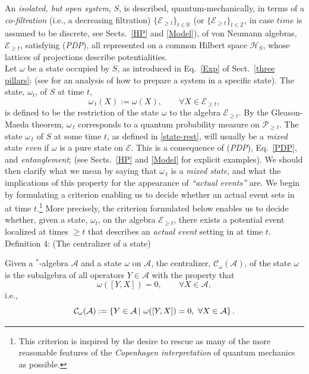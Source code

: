 \documentclass[12pt]{article}
\begin{document}
An \textit{isolated, but open system}, $S$, is described, quantum-mechanically, in terms of a \textit{co-filtration} (i.e., a decreasing filtration)
$\lbrace \mathcal{E}_{\geq t} \rbrace_{t \in \mathbb{R}}$ (or $\lbrace \mathcal{E}_{\geq t} \rbrace_{t \in \mathbb{Z}}$, in case $time$ is assumed to be discrete, see Sects.~\ref{HP} and \ref{Model}), of von
Neumann algebras, $\mathcal{E}_{\geq t}$, satisfying (\textit{PDP}), all represented on a common Hilbert space $\mathcal{H}_S$,
whose lattices of projections describe potentialities. \\

Let $\omega$ be a state occupied by $S$, as introduced in Eq.~\eqref{Exp} of Sect.~\ref{three pillars}; (see \cite{Fr-Schub} for an analysis of how to prepare a system in a specific state). The state,
$\omega_t$, of $S$ at time $t$,
\begin{equation}\label{state-rest}
\omega_{\,t}(X):= \omega(X), \qquad \forall X \in \mathcal{E}_{\geq t},
\end{equation}
is defined to be the restriction of the state $\omega$ to the algebra $\mathcal{E}_{\geq t}$. By the Gleason-Maeda theorem,
$\omega_{\,t}$
corresponds to a quantum probability measure on $\mathcal{P}_{\geq t}$. The state $\omega_{\,t}$ of $S$
at some time $t$, as defined in \eqref{state-rest}, will usually be a \textit{mixed} state  \textit{even} if $\omega$
is a pure state on $\mathcal{E}$. This is a consequence of (\textit{PDP}), Eq.~\eqref{PDP}, and \textit{entanglement}; (see Sects.~\ref{HP} and \ref{Model} for explicit examples). We should then clarify what we mean by saying that
$\omega_{\,t}$ is a \textit{mixed state}, and what the implications of this property for the appearance
of \textit{``actual events''} are.
We begin by formulating a criterion enabling us to decide whether an actual event sets in at time
$t$.\footnote{This criterion is inspired by the desire to rescue as many of the more reasonable features of the \textit{Copenhagen interpretation} of quantum mechanics as possible.} More precisely, the criterion formulated below
enables us to decide whether, given a state, $\omega_t$, on the algebra $\mathcal{E}_{\geq t}$, there exists a potential
event localized at times $\geq t$ that describes an \textit{actual event} setting in at time $t$.\\

{Definition 4}: (The centralizer of a state) \label{defcentralizer}

Given a $^{*}$-algebra $\mathcal{A}$ and a state $\omega$ on $\mathcal{A}$, the centralizer,
$\mathcal{C}_{\omega}(\mathcal{A})$, of the state $\omega$ is the subalgebra of all operators $Y \in \mathcal{A}$
with the property that
$$\omega([Y, X]) =0, \qquad \forall X \in \mathcal{A},$$
i.e.,
$$\hspace{2.8cm}\mathcal{C}_{\omega}(\mathcal{A}):=\left\{Y\in \mathcal{A}\, \vert \,\,\omega([Y, X]) =0, \,\,\forall X \in \mathcal{A}\right\} .
\hspace{2.8cm} \square$$
\end{document}
